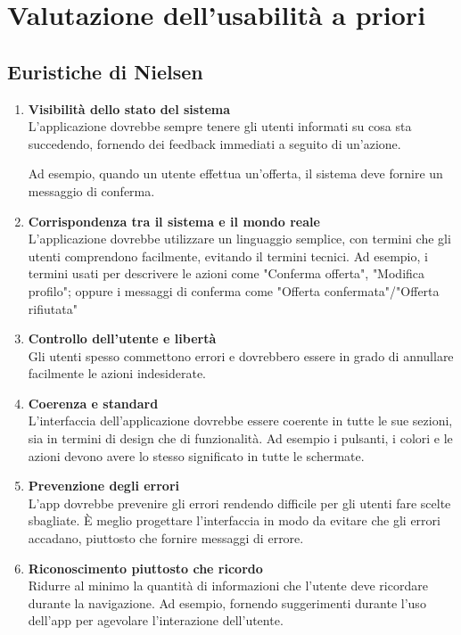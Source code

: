 \section{Valutazione dell'usabilità a priori}
\subsection{Euristiche di Nielsen}
\begin{enumerate}
	\item \textbf{\sffamily Visibilità dello stato del sistema} \\
	      L'applicazione dovrebbe sempre tenere gli utenti informati su cosa sta succedendo, fornendo dei feedback immediati a seguito di un'azione.

	      Ad esempio, quando un utente effettua un'offerta, il sistema deve fornire un messaggio di conferma.

	\item \textbf{\sffamily Corrispondenza tra il sistema e il mondo reale} \\
	      L'applicazione dovrebbe utilizzare un linguaggio semplice, con termini che gli utenti comprendono facilmente, evitando il termini tecnici.
	      Ad esempio, i termini usati per descrivere le azioni come "Conferma offerta", "Modifica profilo"; oppure i messaggi di conferma come "Offerta confermata"/"Offerta rifiutata"

	\item \textbf{\sffamily Controllo dell'utente e libertà} \\
	      Gli utenti spesso commettono errori e dovrebbero essere in grado di annullare facilmente le azioni indesiderate.

	\item \textbf{\sffamily Coerenza e standard} \\
	      L'interfaccia dell'applicazione dovrebbe essere coerente in tutte le sue sezioni, sia in termini di design che di funzionalità.
	      Ad esempio i pulsanti, i colori e le azioni devono avere lo stesso significato in tutte le schermate.

	\item \textbf{\sffamily Prevenzione degli errori} \\
	      L'app dovrebbe prevenire gli errori rendendo difficile per gli utenti fare scelte sbagliate. È meglio progettare l'interfaccia in modo da evitare che gli errori accadano, piuttosto che fornire messaggi di errore.

	\item \textbf{\sffamily Riconoscimento piuttosto che ricordo} \\
	      Ridurre al minimo la quantità di informazioni che l'utente deve ricordare durante la navigazione.
	      Ad esempio, fornendo suggerimenti durante l'uso dell'app per agevolare l'interazione dell'utente.


\end{enumerate}
